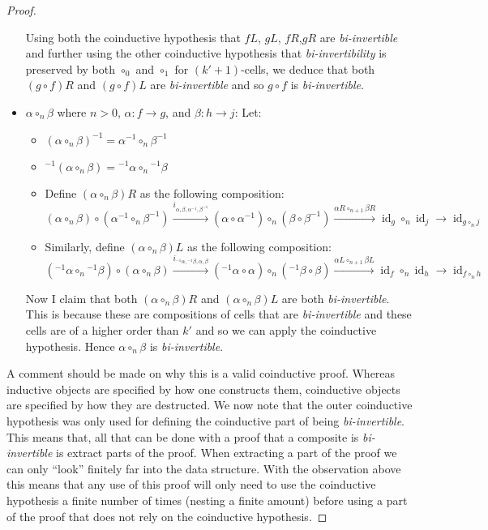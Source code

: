 \documentclass{article}
\theoremstyle{definition}
\theoremstyle{examplestyle}
\DeclareMathOperator{\id}{id}
\newcommand{\linv}[1]{{}^{-1}\!#1}
\newcommand{\rinv}[1]{#1^{-1}}
\begin{document}
\begin{proof}
\begin{itemize}
      Using both the coinductive hypothesis that \(fL\), \(gL\), \(fR\),\(gR\) are \emph{bi-invertible} and further using the other coinductive hypothesis that \emph{bi-invertibility} is preserved by both \(\circ_0\) and \(\circ_1\) for \((k'+1)\)-cells, we deduce that both \((g \circ f)R\) and \((g \circ f)L\) are \emph{bi-invertible} and so \(g \circ f\) is \emph{bi-invertible}.
    \item \(\alpha \circ_n \beta\) where \(n > 0\), \(\alpha: f \to g\), and \(\beta: h \to j\): Let:
      \begin{itemize}
      \item \(\rinv {(\alpha \circ_n \beta)} = \rinv \alpha \circ_n \rinv \beta\)
      \item \(\linv {(\alpha \circ_n \beta)} = \linv \alpha \circ_n \linv \beta\)
      \item Define \((\alpha \circ_n \beta)R\) as the following composition:
        \begin{equation*}
          (\alpha \circ_n \beta) \circ (\rinv \alpha \circ_n \rinv \beta) \overset {i_{\alpha,\beta,\rinv \alpha, \rinv \beta}} \to (\alpha \circ \rinv \alpha) \circ_n (\beta \circ \rinv \beta) \overset {\alpha R \circ_{n+1} \beta R} \to \id_g \circ_n \id_j \to \id_{g \circ_n j}
        \end{equation*}
      \item Similarly, define \((\alpha \circ_n \beta)L\) as the following composition:
        \begin{equation*}
          (\linv \alpha \circ_n \linv \beta) \circ (\alpha \circ_n \beta) \overset {i_{\linv \alpha, \linv \beta, \alpha, \beta}} \to (\linv \alpha \circ \alpha) \circ_n (\linv \beta \circ \beta) \overset {\alpha L \circ_{n+1} \beta L} \to \id_f \circ_n \id_h \to \id_{f \circ_n h}
        \end{equation*}
    \end{itemize}
    Now I claim that both \((\alpha \circ_n \beta)R\) and \((\alpha \circ_n \beta)L\) are both \emph{bi-invertible}. This is because these are compositions of cells that are \emph{bi-invertible} and these cells are of a higher order than \(k'\) and so we can apply the coinductive hypothesis. Hence \(\alpha \circ_n \beta\) is \emph{bi-invertible}.
  \end{itemize}
  A comment should be made on why this is a valid coinductive proof. Whereas inductive objects are specified by how one constructs them, coinductive objects are specified by how they are destructed. We now note that the outer coinductive hypothesis was only used for defining the coinductive part of being \emph{bi-invertible}. This means that, all that can be done with a proof that a composite is \emph{bi-invertible} is extract parts of the proof. When extracting a part of the proof we can only ``look'' finitely far into the data structure. With the observation above this means that any use of this proof will only need to use the coinductive hypothesis a finite number of times (nesting a finite amount) before using a part of the proof that does not rely on the coinductive hypothesis.
\end{proof}
\end{document}
